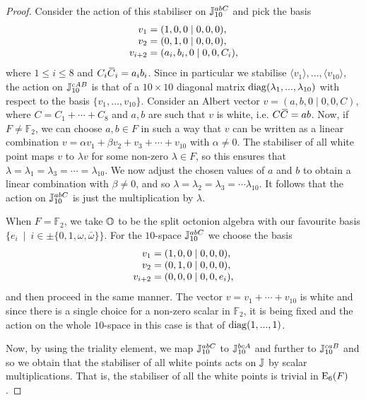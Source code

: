 \begin{proof}
 Consider the action of
this stabiliser on $\mathbb{J}_{10}^{abC}$ and pick the basis
\begin{equation}
	\begin{array}{r@{\;}c@{\;}l}
		v_1 & = & (1,0,0\mid 0,0,0), \\
		v_2 & = & (0,1,0\mid 0,0,0), \\
		v_{i+2} & = & (a_i, b_i,0\mid 0,0,C_i),
	\end{array}
\end{equation} 
where $1 \leqslant i \leqslant 8$ and $C_i \mathord{\mbox{\hspace*{0pt}}\,\overline{\!C\!\!\;}\!\:}\mbox{\hspace*{0pt}}_i = a_i b_i$. Since in particular we stabilise
$\langle v_1 \rangle,...,\langle v_{10}\rangle$, the action on $\mathbb{J}_{10}^{cAB}$ is that of a 
$10 \times 10$ diagonal matrix $\mathrm{diag}(\lambda_1, ..., \lambda_{10})$ 
with respect to the basis $\{v_1, ..., v_{10}\}$. Consider 
an Albert vector $v = (a,b,0\mid 0,0,C)$, where $C = C_1 + \cdots + C_8$ and 
$a,b$ are such that $v$ is white, i.e. $C\mathord{\mbox{\hspace*{0pt}}\,\overline{\!C\!\!\;}\!\:}\mbox{\hspace*{0pt}} = ab$. Now, if $F\neq \mathbb{F}_2$, we can choose
$a,b \in F$ in such a way that $v$ can be written as a linear combination 
$v = \alpha v_1 + \beta v_2 + v_3 + \cdots + v_{10}$ with $\alpha \neq 0$. The stabiliser of 
all white point maps $v$ to $\lambda v$ for some non-zero $\lambda \in F$, so this ensures
that $\lambda = \lambda_1 = \lambda_3 = \cdots = \lambda_{10}$. We now adjust the chosen values
of $a$ and $b$ to obtain a linear combination with $\beta \neq 0$, and so $\lambda = 
\lambda_2 = \lambda_3 = \cdots \lambda_{10}$. It follows that the action on $\mathbb{J}_{10}^{abC}$ 
is just the multiplication by $\lambda$. 

When $F = \mathbb{F}_2$, we take $\mathbb{O}$ to be the split octonion algebra with 
our favourite basis $\{ e_i\ \mid\ i \in \pm \{0,1,\omega,\bar{\omega}\}\}$. For the 
$10$-space $\mathbb{J}_{10}^{abC}$ we choose the basis 
\begin{equation}
	\begin{array}{r@{\;}c@{\;}l}
		v_1 & = & (1,0,0\mid 0,0,0), \\
		v_2 & = & (0,1,0\mid 0,0,0), \\
		v_{i+2} & = & (0,0,0\mid 0,0,e_i),
	\end{array}
\end{equation} 
and then proceed in the same manner. The vector $v = v_1 + \cdots + v_{10}$ is white and since 
there is a single choice for a non-zero scalar in $\mathbb{F}_2$, it is being fixed and 
the action on the whole $10$-space in this case is that of $\mathrm{diag}(1,..., 1)$. 

Now, by using the triality element, we map $\mathbb{J}_{10}^{abC}$ to $\mathbb{J}_{10}^{bcA}$ and further
to $\mathbb{J}_{10}^{caB}$ and so we obtain that the stabiliser of all white points
acts on $\mathbb{J}$ by scalar multiplications. That is, the stabiliser of all the white points
is trivial in $\mathord{\mathrm{E}}_6(F)$. 

\end{proof}

